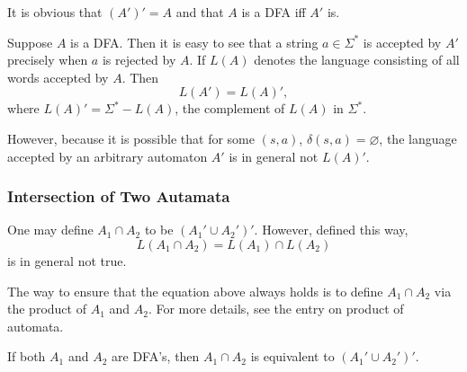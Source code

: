 \documentclass[12pt]{article}
\begin{document}
It is obvious that $(A')'=A$ and that $A$ is a DFA iff $A'$ is.

Suppose $A$ is a DFA.  Then it is easy to see that a string $a\in \Sigma^*$ is accepted by $A'$ precisely when $a$ is rejected by $A$.  If $L(A)$ denotes the language consisting of all words accepted by $A$.  Then $$L(A')=L(A)',$$ where $L(A)'=\Sigma^*-L(A)$, the complement of $L(A)$ in $\Sigma^*$.

However, because it is possible that for some $(s,a)$, $\delta(s,a)=\varnothing$, the language accepted by an arbitrary automaton $A'$ is in general not $L(A)'$.

\subsubsection*{Intersection of Two Autamata}

One may define $A_1\cap A_2$ to be $(A_1'\cup A_2')'$.  However, defined this way, $$L(A_1\cap A_2)=L(A_1)\cap L(A_2)$$ is in general not true.

The way to ensure that the equation above always holds is to define $A_1\cap A_2$ via the product of $A_1$ and $A_2$.  For more details, see the entry on product of automata.

If both $A_1$ and $A_2$ are DFA's, then $A_1\cap A_2$ is equivalent to $(A_1'\cup A_2')'$.
\end{document}

